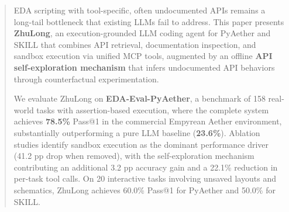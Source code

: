\documentclass[anonymous, sigconf]{acmart}
\begin{document}
\begin{abstract}
    EDA scripting with tool-specific, often undocumented APIs remains a long-tail 
    bottleneck that existing LLMs fail to address. This paper presents 
    \textbf{ZhuLong}, an execution-grounded LLM coding agent for PyAether and 
    SKILL that combines API retrieval, documentation inspection, and sandbox 
    execution via unified MCP tools, augmented by an offline \textbf{API 
    self-exploration mechanism} that infers undocumented API behaviors through 
    counterfactual experimentation.
    
    We evaluate ZhuLong on \textbf{EDA-Eval-PyAether}, a benchmark of 158
    real-world tasks with assertion-based execution, where the complete system
    achieves \textbf{78.5\%} Pass@1 in the commercial Empyrean Aether
    environment, substantially outperforming a pure LLM baseline (\textbf{23.6\%}). Ablation studies identify sandbox execution as the dominant
    performance driver (41.2 pp drop when removed), with the self-exploration
    mechanism contributing an additional 3.2 pp accuracy gain and a 22.1\%
    reduction in per-task tool calls. On 20 interactive tasks involving unsaved
    layouts and schematics, ZhuLong achieves 60.0\% Pass@1 for PyAether and
    50.0\% for SKILL. 
\end{abstract}

\end{document}
